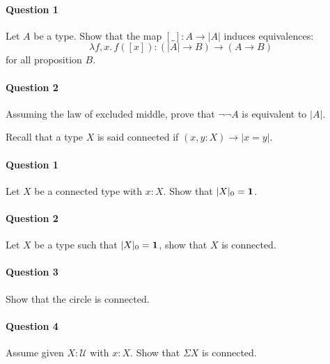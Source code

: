 \documentclass{article}[6pt]%
\newcommand{\U}{{\mathcal U}}
\renewcommand{\r}{\rightarrow}
\newcommand{\Gl}{\lambda}
\newcommand{\one}{{\bf 1}}
\begin{document}
\begin{Exercise}[title={Propositional truncation}]

\paragraph{Question 1} Let $A$ be a type. Show that the map $[\_] : A\r |A|$ induces equivalences:
\[\Gl f,x.\, f([x]) : (|A|\r B) \r (A\r B)\]
for all proposition $B$.%



\paragraph{Question 2} Assuming the law of excluded middle, prove that $\lnot\lnot A$ is equivalent to $|A|$.   

\end{Exercise}


\begin{Exercise}[title={Connected types}]
Recall that a type $X$ is said connected if $(x,y:X)\r |x=y|$.

\paragraph{Question 1} Let $X$ be a connected type with $x:X$. Show that $|X|_0=\one$.

\paragraph{Question 2} Let $X$ be a type such that $|X|_0=\one$, show that $X$ is connected.

\paragraph{Question 3} Show that the circle is connected.

\paragraph{Question 4} Assume given $X:\U$ with $x:X$. Show that $\Sigma X$ is connected.

\end{Exercise}
\end{document}
